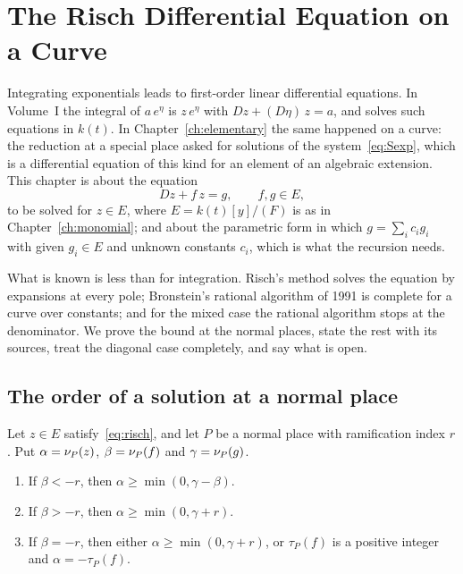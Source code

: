 \chapter{The Risch Differential Equation on a Curve}\label{ch:risch-equation}

Integrating exponentials leads to first-order linear differential equations.
In Volume~I the integral of $a\,e^{\eta}$ is $z\,e^{\eta}$ with $Dz + (D\eta)\,z
= a$, and  solves such equations in $k(t)$. In
Chapter~\ref{ch:elementary} the same happened on a curve: the reduction at a
special place asked for solutions of the system~\eqref{eq:Sexp}, which is a
differential equation of this kind for an element of an algebraic extension.
This chapter is about the equation
\begin{equation}\label{eq:risch}
  Dz + f\,z = g, \qquad f, g \in E ,
\end{equation}
to be solved for $z \in E$, where $E = k(t)[y]/(F)$ is as in
Chapter~\ref{ch:monomial}; and about the parametric form in which $g =
\sum_i c_i g_i$ with given $g_i \in E$ and unknown constants $c_i$, which is
what the recursion needs.

What is known is less than for integration. Risch's method solves the
equation by expansions at every pole; Bronstein's rational algorithm of 1991
is complete for a curve over constants; and for the mixed case the rational
algorithm stops at the denominator. We prove the bound at the normal places,
state the rest with its sources, treat the diagonal case completely, and say
what is open.

\section{The order of a solution at a normal place}\label{sec:rde-normal}

\begin{theorem}\label{thm:rde-normal}
Let $z \in E$ satisfy~\eqref{eq:risch}, and let $P$ be a normal place with
ramification index $r$. Put $\alpha = \nu_{P}(z)$, $\beta = \nu_{P}(f)$ and
$\gamma = \nu_{P}(g)$.
\begin{enumerate}[label=\textup{(\roman*)}]
\item If $\beta < -r$, then $\alpha \ge \min(0, \gamma - \beta)$.
\item If $\beta > -r$, then $\alpha \ge \min(0, \gamma + r)$.
\item If $\beta = -r$, then either $\alpha \ge \min(0, \gamma + r)$, or
  $\tau_P(f)$ is a positive integer and $\alpha = -\tau_P(f)$.
\end{enumerate}
\end{theorem}

